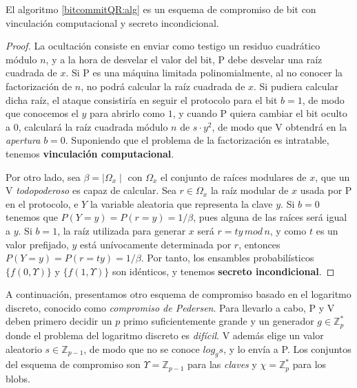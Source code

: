 \begin{proposition}
	El algoritmo \ref{bitcommitQR:alg} es un esquema de compromiso de bit con vinculación computacional y secreto incondicional.
\end{proposition}

\begin{proof}
	La ocultación consiste en enviar como testigo un residuo cuadrático módulo $n$, y a la hora de desvelar el valor del bit, P debe desvelar una raíz cuadrada de $x$. Si P es una máquina limitada polinomialmente, al no conocer la factorización de $n$, no podrá calcular la raíz cuadrada de $x$. Si pudiera calcular dicha raíz, el ataque consistiría en seguir el protocolo para el bit $b=1$, de modo que conocemos el $y$ para abrirlo como $1$, y cuando P quiera cambiar el bit oculto a $0$, calculará la raíz cuadrada módulo $n$ de $s\cdot y^2$, de modo que V obtendrá en la \textit{apertura} $b=0$. Suponiendo que el problema de la factorización es intratable, tenemos \textbf{vinculación computacional}.
	
	
	Por otro lado, sea $\beta=\mid \Omega_x \mid$ con $\Omega_x$ el conjunto de raíces modulares de $x$, que un V \textit{todopoderoso} es capaz de calcular.
	Sea $r \in \Omega_x$ la raíz modular de $x$ usada por P en el protocolo, e $Y$ la variable aleatoria que representa la clave $y$. Si $b=0$ tenemos que $P(Y=y)=P(r=y)=1/\beta$, pues alguna de las raíces será igual a $y$. Si $b=1$, la raíz utilizada para generar $x$ será $r=t y\, mod\, n$, y como $t$ es un valor prefijado, $y$ está unívocamente determinada por $r$, entonces $P(Y=y)=P(r=ty)=1/\beta$. Por tanto, los ensambles probabilísticos $\{f(0,\Upsilon)\}$ y $\{f(1,\Upsilon)\}$ son idénticos, y tenemos \textbf{secreto incondicional}.
	
\end{proof}


\hfil


A continuación, presentamos otro esquema de compromiso basado en el logaritmo discreto, conocido como \textit{compromiso de Pedersen}. Para llevarlo a cabo, P y V deben primero decidir un $p$ primo suficientemente grande y un generador $g\in \mathbb{Z}_p^*$ donde el problema del logaritmo discreto es \textit{difícil}. V además elige un valor aleatorio $s\in \mathbb{Z}_{p-1}$, de modo que no se conoce $log_g s$, y lo envía a P. Los conjuntos del esquema de compromiso son $\Upsilon = \mathbb{Z}_{p-1}$ para las \textit{claves} y $\chi= \mathbb{Z}_p^*$ para los blobs.





